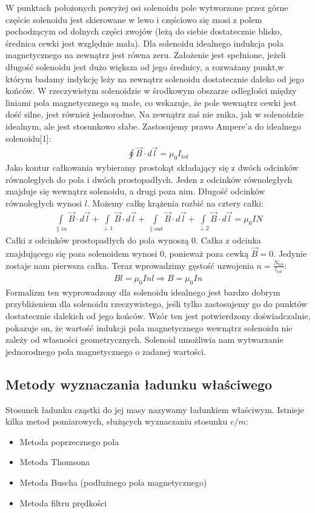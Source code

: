 \documentclass[paper=a4, fontsize=12pt]{scrartcl}
\begin{document}
W punktach położonych powyżej osi solenoidu pole wytworzone przez górne częście solenoidu jest skierowane w lewo i częściowo się znosi z polem pochodzącym od dolnych części zwojów (leżą do siebie dostatecznie blisko, średnica cewki jest względnie mała). Dla solenoidu idealnego indukcja pola magnetycznego na zewnątrz jest równa zeru. Założenie jest spełnione, jeżeli długość solenoidu jest dużo większa od jego średnicy, a rozważany punkt,w którym badamy indykcję leży na zewnątrz solenoidu dostatecznie daleko od jego końców. 
W rzeczywistym solenoidzie w środkowym obszarze odległości między liniami pola magnetycznego są małe, co wskazuje, że pole wewnątrz cewki jest dość silne, jest również jednorodne. Na zewnątrz zaś nie znika, jak w solenoidzie idealnym, ale jest stosunkowo słabe.
Zastosujemy prawo Ampere’a do idealnego solenoidu[1]:
\begin{align*}
\oint \vec{B}\cdot d\vec{l}=\mu_0I_{tot}
\end{align*}
Jako kontur całkowania wybieramy prostokąt składający się z dwóch odcinków równoległych do pola i dwóch prostopadłych. Jeden z odcinków równoległych znajduje się wewnątrz solenoidu, a drugi poza nim. Długość odcinków równoległych wynosi $l$. Możemy całkę krążenia rozbić na cztery całki:
\begin{align*}
\int\limits_{\parallel in} \vec{B}\cdot d\vec{l}
+\int\limits_{\perp 1} \vec{B}\cdot d\vec{l}
+\int\limits_{\parallel out} \vec{B}\cdot d\vec{l}
+\int\limits_{\perp 2} \vec{B}\cdot d\vec{l} =
\mu_0 IN
\end{align*}
Całki z odcinków prostopadłych do pola wynoszą $0$. Całka z odcinka znajdującego się poza solenoidem wynosi $0$, ponieważ poza cewką $\vec{B}=0$. Jedynie zostaje nam pierwsza całka. Teraz wprowadzimy gęstość uzwojenia $n=\frac{N_{tot}}{l_{tot}}$:
\begin{align*}
Bl=\mu_0 Inl\Rightarrow B=\mu_0In
\end{align*}
Formalizm ten wyprowadzony dla solenoidu idealnego jest bardzo dobrym przybliżeniem dla solenoidu rzeczywistego, jeśli tylko zastosujemy go do punktów dostatecznie dalekich od jego końców. Wzór ten jest potwierdzony doświadczalnie, pokazuje on, że wartość indukcji pola magnetycznego wewnątrz solenoidu nie zależy od własności geometrycznych. Solenoid umożliwia nam wytwarzanie jednorodnego pola magnetycznego o zadanej wartości.
\subsection{Metody wyznaczania ładunku właściwego}
Stosunek ładunku cząstki do jej masy nazywamy ładunkiem właściwym. Istnieje kilka metod pomiarowych, służących wyznaczaniu stosunku $e/m$:
\begin{itemize}
	\item Metoda poprzecznego pola
	\item Metoda Thomsona 
	\item Metoda Buscha (podłużnego pola magnetycznego)
	\item Metoda filtru prędkości
\end{itemize}
\end{document}
